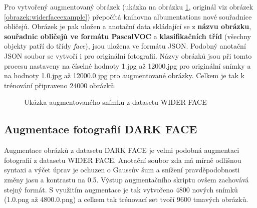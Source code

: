 Pro vytvořený augmentovaný obrázek (ukázka na obrázku \ref{obrazek:augmentovanyobrazek}, originál viz obrázek \ref{obrazek:widerfaceexample}) přepočítá knihovna albumentations nové souřadnice obličejů. Obrázek je pak uložen a anotační data skládající se z \textbf{názvu obrázku}, \textbf{souřadnic obličejů ve formátu PascalVOC} a \textbf{klasifikačních tříd} (všechny objekty patří do třídy \emph{face}), jsou uložena ve formátu JSON. Podobný anotační JSON soubor se vytvoří i pro originální fotografii. Názvy obrázků jsou při tomto procesu nastaveny na číselné hodnoty 1.jpg až 12000.jpg pro originální snímky a na hodnoty 1.0.jpg až 12000.0.jpg pro augmentované obrázky. Celkem je tak k trénování připraveno 24000 obrázků.

\begin{figure}[H]
  \begin{center}
  \label{obrazek:augmentovanyobrazek}
  \caption{Ukázka augmentovaného snímku z datasetu WIDER FACE}
  \end{center}
\end{figure}

\subsection*{Augmentace fotografií DARK FACE}
Augmentace obrázků z datasetu DARK FACE je velmi podobná augmentaci fotografií z datasetu WIDER FACE. Anotační soubor zda má mírně odlišnou syntaxi a výčet úprav je ochuzen o Gaussův šum a snížení pravděpodobnosti změny jasu a kontrastu na 0.5. Výstup augmentačního skriptu ovšem zachovává stejný formát. S využitím augmentace je tak vytvořeno 4800 nových snímků (1.0.png až 4800.0.png) a celkem tak trénovací set tvoří 9600 tmavých obrázků.

